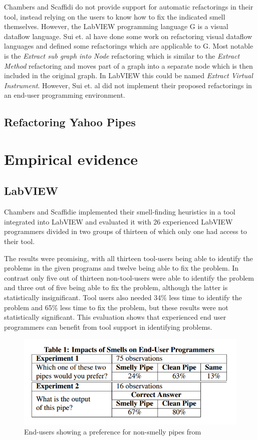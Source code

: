 \documentclass[10pt,conference,compsocconf]{IEEEtran}
\begin{document}
Chambers and Scaffidi \cite{chambers2013smell} do not provide support for automatic refactorings in their tool, instead relying on the users to know how to fix the indicated smell themselves.
However, the LabVIEW programming language G is a visual dataflow language.
Sui et. al \cite{sui2008automated} have done some work on refactoring visual dataflow languages and defined some refactorings which are applicable to G.
Most notable is the \textit{Extract sub graph into Node} refactoring which is similar to the \textit{Extract Method} refactoring and moves part of a graph into a separate node which is then included in the original graph.
In LabVIEW this could be named \textit{Extract Virtual Instrument}.
However, Sui et. al did not implement their proposed refactorings in an end-user programming environment.

\subsection{Refactoring Yahoo Pipes}

\section{Empirical evidence}
\label{sec:empirical}

\subsection{LabVIEW}

Chambers and Scaffidie implemented their smell-finding heuristics in a tool integrated into LabVIEW and evaluated it with 26 experienced LabVIEW programmers divided in two groups of thirteen of which only one had access to their tool.

The results were promising, with all thirteen tool-users being able to identify the problems in the given programs and twelve being able to fix the problem.
In contrast only five out of thirteen non-tool-users were able to identify the problem and three out of five being able to fix the problem, although the latter is statistically insignificant.
Tool users also needed 34\% less time to identify the problem and 65\% less time to fix the problem, but these results were not statistically significant.
This evaluation shows that experienced end user programmers can benefit from tool support in identifying problems.

\begin{figure}
\centering
\includegraphics[width=\columnwidth]{Table1-Stolee2011}
\caption{End-users showing a preference for non-smelly pipes from \cite{Stolee2011}}
\label{fig:Table1-Stolee2011}
\end{figure}
\end{document}
